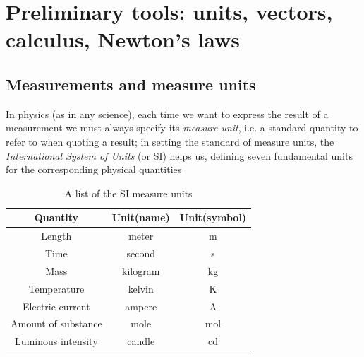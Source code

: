 \documentclass[11pt, a4paper,oneside,openright]{book}
\numberwithin{equation}{section}
\begin{document}
\tableofcontents

\chapter{Preliminary tools: units, vectors, calculus, Newton's laws}

\section{Measurements and measure units}
In physics (as in any science), each time we want to express the result of a measurement we must always specify its \textit{measure unit}, i.e. a standard quantity to refer to when quoting a result; in setting the standard of measure units, the \textit{International System of Units} (or SI) helps us, defining seven fundamental units for the corresponding physical quantities

\begin{table}[htdp]
\begin{center}
\begin{tabular}{|c|c|c|} \hline
\textbf{Quantity} & \textbf{Unit(name)} & \textbf{Unit(symbol)} \\ \hline
Length & meter & m \\ \hline
Time & second & s \\ \hline
Mass & kilogram & kg \\ \hline
Temperature & kelvin & K \\ \hline
Electric current & ampere & A \\ \hline
Amount of substance & mole & mol \\ \hline
Luminous intensity & candle & cd \\ \hline
\end{tabular}
\end{center}
\caption{A list of the SI measure units}
\end{table}
\end{document}
